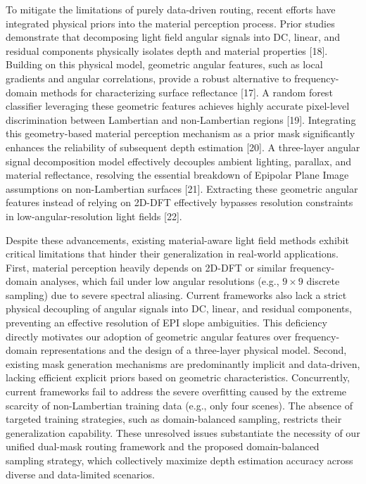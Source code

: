 To mitigate the limitations of purely data-driven routing, recent efforts have integrated physical priors into the material perception process. Prior studies demonstrate that decomposing light field angular signals into DC, linear, and residual components physically isolates depth and material properties [18]. Building on this physical model, geometric angular features, such as local gradients and angular correlations, provide a robust alternative to frequency-domain methods for characterizing surface reflectance [17]. A random forest classifier leveraging these geometric features achieves highly accurate pixel-level discrimination between Lambertian and non-Lambertian regions [19]. Integrating this geometry-based material perception mechanism as a prior mask significantly enhances the reliability of subsequent depth estimation [20]. A three-layer angular signal decomposition model effectively decouples ambient lighting, parallax, and material reflectance, resolving the essential breakdown of Epipolar Plane Image assumptions on non-Lambertian surfaces [21]. Extracting these geometric angular features instead of relying on 2D-DFT effectively bypasses resolution constraints in low-angular-resolution light fields [22].

Despite these advancements, existing material-aware light field methods exhibit critical limitations that hinder their generalization in real-world applications. First, material perception heavily depends on 2D-DFT or similar frequency-domain analyses, which fail under low angular resolutions (e.g., $9 \times 9$ discrete sampling) due to severe spectral aliasing. Current frameworks also lack a strict physical decoupling of angular signals into DC, linear, and residual components, preventing an effective resolution of EPI slope ambiguities. This deficiency directly motivates our adoption of geometric angular features over frequency-domain representations and the design of a three-layer physical model. Second, existing mask generation mechanisms are predominantly implicit and data-driven, lacking efficient explicit priors based on geometric characteristics. Concurrently, current frameworks fail to address the severe overfitting caused by the extreme scarcity of non-Lambertian training data (e.g., only four scenes). The absence of targeted training strategies, such as domain-balanced sampling, restricts their generalization capability. These unresolved issues substantiate the necessity of our unified dual-mask routing framework and the proposed domain-balanced sampling strategy, which collectively maximize depth estimation accuracy across diverse and data-limited scenarios.

